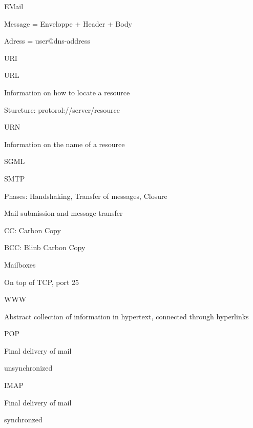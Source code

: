 \documentclass[main.tex]{subfiles}
\begin{document}
\begin{card}{EMail}
\item Message = Enveloppe + Header + Body
\item Adress = user@dns-address
\end{card}


\begin{card}{URI}
\TODO
\end{card}


\begin{card}{URL}
\item Information on how to locate a resource
\item Sturcture: protorol://server/resource
\end{card}


\begin{card}{URN}
\item Information on the name of a resource
\end{card}


\begin{card}{SGML}
\TODO
\end{card}


\begin{card}{SMTP}
\item Phases: Handshaking, Transfer  of  messages, Closure
\item Mail submission and message transfer
\item CC: Carbon Copy
\item BCC: Blinb Carbon Copy
\item Mailboxes
\item On top of TCP, port 25
\end{card}



\begin{card}{WWW}
\item Abstract collection of information in hypertext, connected through hyperlinks
\end{card}


\begin{card}{POP}
\item Final delivery of mail
\item unsynchronized
\end{card}


\begin{card}{IMAP}
\item Final delivery of mail
\item synchronzed
\end{card}
\end{document}
